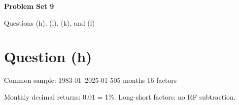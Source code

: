 \documentclass[11pt,letterpaper]{article}
\begin{document}
\begin{center}
{\LARGE\bfseries Problem Set 9}\par\vspace{3pt}
{\large Questions (h), (i), (k), and (l)}
\end{center}
\vspace{2pt}

\section*{Question (h)}

Common sample: 1983-01--2025-01 \textbar{} 505 months \textbar{} 16 factors


Monthly decimal returns: 0.01 = 1\%. Long-short factors: no RF subtraction.


\end{document}

